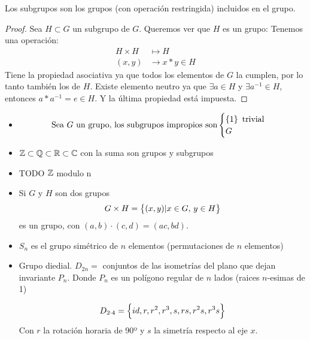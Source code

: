 \begin{obs}
    Los subgrupos son los grupos (con operación restringida) incluidos en el grupo.
\end{obs}
\begin{proof}
    Sea $H \subset G$ un subgrupo de $G$. Queremos ver que $H$ es un grupo:
    Tenemos una operación:
    \[
        \begin{aligned}
            H \times H &\mapsto H \\
            (x, y) &\to x*y \in H
        \end{aligned}
    \]
    Tiene la propiedad asociativa ya que todos los elementos de $G$ la cumplen, por lo tanto también los de $H$.
    Existe elemento neutro ya que $\exists a \in H$ y $\exists a^{-1} \in H$, entonces $a*a^{-1}=e \in H$.
    Y la última propiedad está impuesta.
\end{proof}

\begin{example}
    \begin{itemize}
        \item
            \[
                \text{Sea $G$ un grupo, los subgrupos impropios son}
                \begin{cases}
                    \left\{1\right\} \text{ trivial} \\
                    G
                \end{cases}
            \]
        \item $\mathbb{Z} \subset \mathbb{Q} \subset \mathbb{R} \subset \mathbb{C}$ con la suma son grupos y subgrupos
        \item TODO $\mathbb{Z}$ modulo n
        \item Si $G$ y $H$ son dos grupos
            \[
                 G \times H = \left\{(x,y) \vert x \in G, \, y \in H\right\}   
            \]
            es un grupo, con $(a, b) \cdot (c, d) = (ac, bd)$.
        \item $S_n$ es el grupo simétrico de $n$ elementos (permutaciones de $n$ elementos)
        \item Grupo diedial. $D_{2n} =$ conjuntos de las isometrías del plano que dejan invariante $P_n$.
            Donde $P_n$ es un polígono regular de $n$ lados (raices $n$-esimas de 1)

            \[
                D_{2 \cdot 4} = \left\{id, r, r^2, r^3, s, rs, r^2s, r^3s\right\}
            \]
            Con $r$ la rotación horaria de 90º y $s$ la simetría respecto al eje $x$.
    \end{itemize}
\end{example}


